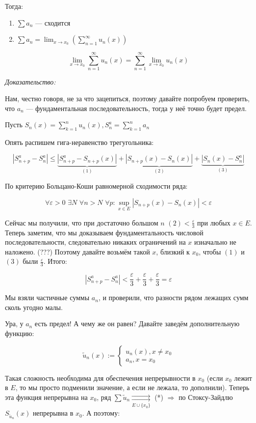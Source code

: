 \documentclass{article}
\def\dbl{\,\,}
\def\rsh#1{\underset{#1}{\rightrightarrows}}
\begin{document}
Тогда:

\begin{enumerate}
    \item $\sum a_n$ --- сходится
    \item $\sum a_n = \lim_{x \rightarrow x_0} \left(\sum_{n = 1}^{\infty} u_n(x) \right)$
\end{enumerate}

\[\lim_{x \rightarrow x_0} \sum_{n = 1}^{\infty} u_n(x) = \sum_{n = 1}^{\infty} \lim_{x \rightarrow x_0} u_n(x)\]

\textit{Доказательство:}

Нам, честно говоря, не за что зацепиться, поэтому давайте попробуем проверить, что $a_n$ --- фундаментальная последовательность, тогда у неё точно будет предел.

Пусть $S_n(x) = \sum_{k = 1}^n u_n(x), S^a_n = \sum_{k = 1}^n a_n$

Опять распишем гига-неравенство трегугольника: 

\[|S^a_{n + p} - S^a_n| \le \underbrace{|S^a_{n + p} - S_{n + p}(x)|}_{(1)} + \underbrace{|S_{n + p}(x) - S_n(x)|}_{(2)} + \underbrace{|S_n(x) - S^a_n|}_{(3)}\]

По критерию Больцано-Коши равномерной сходимости ряда:

\[\forall \varepsilon > 0 \dbl \exists N \dbl \forall n > N \dbl \forall p: \sup_{x \in E} \left|S_{n + p}(x) - S_n(x) \right| < \varepsilon\]

Сейчас мы получили, что при достаточно большом $n \dbl (2) < \frac{\varepsilon}{3}$ при любых $x \in E$. Теперь заметим, что мы доказываем фундаментальность числовой последовательности, следовательно никаких ограничений на $x$ изначально не наложено. (???) Поэтому давайте возьмём такой $x$, близкий к $x_0$, чтобы $(1)$ и $(3)$ были $\frac{\varepsilon}{3}$. Итого:

\[|S^a_{n + p} - S^a_n| < \frac{\varepsilon}{3} + \frac{\varepsilon}{3} + \frac{\varepsilon}{3} = \varepsilon\]

Мы взяли частичные суммы $a_n$, и проверили, что разности рядом лежащих сумм сколь угодно малы.

Ура, у $a_n$ есть предел! А чему же он равен? Давайте заведём дополнительную функцию: 

\[\widetilde{u}_n(x) := \begin{cases}
    u_n(x), x \neq x_0\\
    a_n, x = x_0
\end{cases}\]

Такая сложность необходима для обеспечения непрерывности в $x_0$ (если $x_0$ лежит в $E$, то мы просто подменили значение, а если не лежала, то дополнили). Теперь эта функция непрерывна на $x_0$, ряд $\sum \widetilde{u}_n \rsh{E \cup \{x_0\}}$ (*) $ \Rightarrow$ по Стоксу-Зайдлю $S_{\widetilde{u}_n}(x)$ непрерывна в $x_0$. А поэтому:
\end{document}
